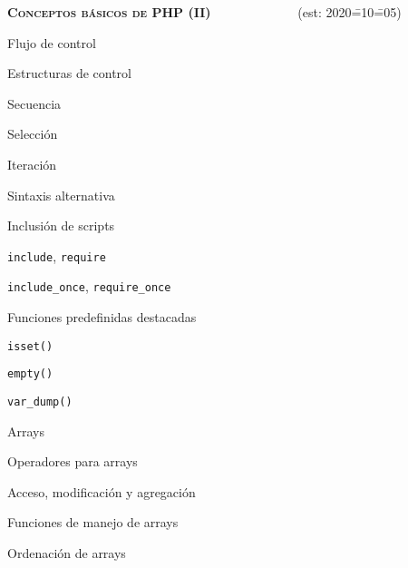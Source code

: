 \begin{longenum}
\begin{longenum}
\begin{longenum}
        \end{longenum}
    \end{longenum}
    \item \textbf{\textsc{Conceptos básicos de PHP (II)}} \ \ \ \ \ \ \ \ \ \ \ \ \ (est: 2020\==10\==05)
    \begin{longenum}
        \item Flujo de control
        \begin{longenum}
            \item Estructuras de control
            \begin{longenum}
                \item Secuencia
                \item Selección
                \item Iteración
                \item Sintaxis alternativa
            \end{longenum}
            \item Inclusión de scripts
            \begin{longenum}
                \item \texttt{include}, \texttt{require}
                \item \texttt{include\_once}, \texttt{require\_once}
            \end{longenum}
        \end{longenum}
        \item Funciones predefinidas destacadas
        \begin{longenum}
            \item \texttt{isset()}
            \item \texttt{empty()}
            \item \texttt{var\_dump()}
        \end{longenum}
        \item Arrays
        \begin{longenum}
            \item Operadores para arrays
            \begin{longenum}
                \item Acceso, modificación y agregación
            \end{longenum}
            \item Funciones de manejo de arrays
            \begin{longenum}
                \item Ordenación de arrays

\end{longenum}
\end{longenum}
\end{longenum}
\end{longenum}
